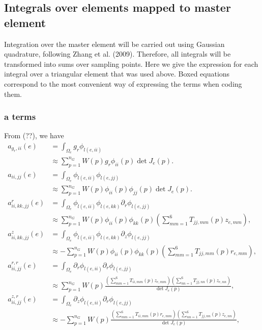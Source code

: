 \documentclass{article}
\begin{document}
\subsection{Integrals over elements mapped to master element}
Integration over the master element will be carried out using Gaussian quadrature, following Zhang et al. (2009). Therefore, all integrals will be transformed into sums over sampling points. Here we give the expression for each integral over a triangular element that was used above. Boxed equations correspond to the most convenient way of expressing the terms when coding them.

\subsubsection{a terms}
From (??), we have
\begin{align}
a_{g_r,ii}(e) &= \int_{\Omega_e} g_r \phi_{l(e,ii)} \tag{20.16}\\
&\approx \sum_{p=1}^{n_G} W(p) g_r \phi_{ii}(p) \det J_e(p). \tag{20.18}\\
a_{ii,jj}(e) &= \int_{\Omega_e} \phi_{l(e,ii)} \phi_{l(e,jj)} \tag{20.19}\\
&\approx \sum_{p=1}^{n_G} W(p) \phi_{ii}(p) \phi_{jj}(p) \det J_e(p). \tag{20.21}\\
a_{ii,kk,jj}^{r}(e) &= \int_{\Omega_e} \phi_{l(e,ii)} \phi_{l(e,kk)} \partial_r \phi_{l(e,jj)} \tag{20.22}\\
&\approx \sum_{p=1}^{n_G} W(p) \phi_{ii}(p) \phi_{kk}(p) \left( \sum_{mm=1}^6 T_{jj,mm}(p) z_{e,mm} \right), \tag{20.25}\\
a_{ii,kk,jj}^{z}(e) &= \int_{\Omega_e} \phi_{l(e,ii)} \phi_{l(e,kk)} \partial_z \phi_{l(e,jj)} \tag{20.26}\\
&\approx -\sum_{p=1}^{n_G} W(p) \phi_{ii}(p) \phi_{kk}(p) \left( \sum_{mm=1}^6 T_{jj,mm}(p) r_{e,mm} \right), \tag{20.28}\\
a_{ii,jj}^{r,r}(e) &= \int_{\Omega_e} \partial_r \phi_{l(e,ii)} \partial_r \phi_{l(e,jj)} \tag{20.29}\\
&\approx \sum_{p=1}^{n_G} W(p) \frac{ \left( \sum_{mm=1}^6 T_{ii,mm}(p) z_{e,mm} \right) \left( \sum_{nn=1}^6 T_{jj,nn}(p) z_{e,nn} \right) }{ \det J_e(p) }, \tag{20.31}\\
a_{ii,jj}^{z,r}(e) &= \int_{\Omega_e} \partial_z \phi_{l(e,ii)} \partial_r \phi_{l(e,jj)} \tag{20.32}\\
&\approx -\sum_{p=1}^{n_G} W(p) \frac{ \left( \sum_{mm=1}^6 T_{ii,mm}(p) r_{e,mm} \right) \left( \sum_{nn=1}^6 T_{jj,nn}(p) z_{e,nn} \right) }{ \det J_e(p) }, \tag{20.34}\\

\end{align}
\end{document}
